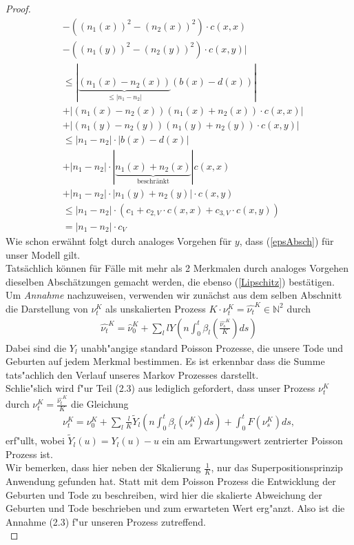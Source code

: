 \documentclass[11pt, a4paper, german]{article}
\theoremstyle{plain}
\begin{document}
\begin{proof}
\begin{align*}
			& - ((n_1(x))^2 - (n_2(x))^2) \cdot c(x,x)\\
			& - ((n_1(y))^2 - (n_2(y))^2) \cdot c(x,y) |\\
			& \le  |\underbrace{(n_1(x) - n_2(x))}_{ \le |n_1 - n_2|}(b(x) - d(x)) |\\
			& + | (n_1(x) - n_2(x))(n_1(x) + n_2(x)) \cdot c(x,x) | \\
			& + | (n_1(y) - n_2(y))(n_1(y) + n_2(y)) \cdot c(x,y) |\\
			& \le |n_1 - n_2| \cdot | b(x) - d(x) | \\
			& +  |n_1 - n_2| \cdot |\underbrace{n_1(x) + n_2(x)}_{\text{beschränkt}}| c(x,x) \\
			& + |n_1 - n_2| \cdot | n_1(y) + n_2(y) | \cdot c(x,y)\\
			& \le |n_1 - n_2| \cdot ( c_1 + c_{2,V} \cdot c(x,x) + c_{3,V} \cdot c(x,y) )\\
			& = |n_1 - n_2| \cdot c_V
		\end{align*}
		Wie schon erwähnt folgt durch analoges Vorgehen für $ y $, dass (\ref{epsAbsch}) für unser Modell gilt.\\ 
		Tatsächlich können für Fälle mit mehr als 2 Merkmalen durch analoges Vorgehen dieselben Abschätzungen gemacht werden, die ebenso (\ref{Lipschitz}) bestätigen.\\
		
		Um  \textit{Annahme \cite[Kapitel 11 - (2.3)]{ethier2009markov}} nachzuweisen, verwenden wir zu\-nächst aus dem selben Abschnitt die Darstellung von $ \nu_t^K $ als unskalierten Prozess $ K\cdot \nu_t^K = \hat{\nu_t}^K \in \mathbb{N}^2 $ durch
		\begin{align*}
			\hat{\nu_t}^K = \hat{\nu}_0^K + \sum_{l} l Y \left( n \int_{0}^{t} \beta_l\left(\frac{\hat{\nu_s}^K}{K}\right) ds \right)
		\end{align*}
		Dabei sind die $ Y_l $ unabh"angige standard Poisson Prozesse, die unsere Tode und Geburten auf jedem Merkmal bestimmen. Es ist erkennbar dass die Summe tats"achlich den Verlauf unseres Markov Prozesses darstellt.\\
		Schlie"slich wird f"ur Teil (2.3) aus \cite[Kapitel 11]{ethier2009markov} lediglich gefordert, dass unser Prozess $ \nu_t^K $ durch $ \nu_t^K = \frac{\hat{\nu_t}^K}{K} $ die Gleichung
		\begin{align*}
			\nu_t^K = \nu_0^K + \sum_{l} \frac{l}{K} \widetilde{Y}_l \left( n \int_{0}^{t} \beta_l(\nu_s^K) ds \right) + \int_{0}^{t} F(\nu_s^K) ds,
		\end{align*}
		erf"ullt, wobei $ \widetilde{Y}_l(u) = Y_l(u) - u $ ein am Erwartungswert zentrierter Poisson Prozess ist.\\
		Wir bemerken, dass hier neben der Skalierung $ \frac{1}{K} $, nur das Superpositionsprinzip Anwendung gefunden hat. Statt mit dem Poisson Prozess die Entwicklung der Geburten und Tode zu beschreiben, wird hier die skalierte Abweichung der Geburten und Tode beschrieben und zum erwarteten Wert erg"anzt. Also ist die Annahme (2.3) f"ur unseren Prozess zutreffend.\\


\end{proof}
\end{document}
